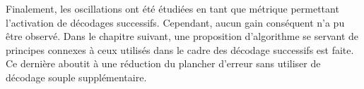 Finalement, les oscillations ont été étudiées en tant que métrique permettant l'activation de décodages successifs. 
Cependant, aucun gain conséquent n'a pu être observé. Dans le chapitre suivant, une proposition d'algorithme se servant de 
 principes connexes à ceux utilisés dans le cadre des décodage successifs est faite. Ce dernière aboutit à une réduction
du plancher d'erreur sans utiliser de décodage souple supplémentaire.